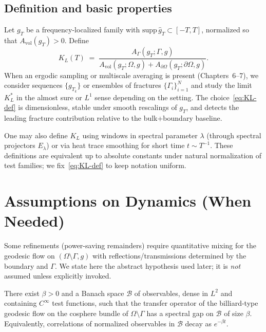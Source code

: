 \subsection{Definition and basic properties}
\label{subsec:intro-KL-def}
Let $g_T$ be a frequency-localized family with
$\mathrm{supp}\,\hat g_T\subset[-T,T]$, normalized so that $A_{\mathrm{vol}}(g_T)>0$.
Define
\begin{equation}
\label{eq:KL-def}
K_L(T)
\;=\;
\frac{A_{\Gamma}(g_T;\Gamma,g)}{A_{\mathrm{vol}}(g_T;\Omega,g)+A_{\partial\Omega}(g_T;\partial\Omega,g)}.
\end{equation}
When an ergodic sampling or multiscale averaging is present (Chapters~6–7), we
consider sequences $\{g_{T_k}\}$ or ensembles of fractures
$\{\Gamma_i\}_{i=1}^N$ and study the limit $K_L^*$ in the almost sure or $L^1$
sense depending on the setting. The choice~\eqref{eq:KL-def} is dimensionless,
stable under smooth rescalings of $g_T$, and detects the leading fracture
contribution relative to the bulk+boundary baseline.

\begin{remark}[Variants]
\label{rem:KL-variants}
One may also define $K_L$ using windows in spectral parameter $\lambda$
(through spectral projectors $E_\lambda$) or via heat trace smoothing for short
time $t\sim T^{-1}$. These definitions are equivalent up to absolute constants
under natural normalization of test families; we fix~\eqref{eq:KL-def} to keep
notation uniform.
\end{remark}

\section{Assumptions on Dynamics (When Needed)}
\label{sec:intro-mixing}

Some refinements (power-saving remainders) require quantitative mixing for the
geodesic flow on $(\Omega\setminus\Gamma,g)$ with reflections/transmissions
determined by the boundary and $\Gamma$. We state here the abstract hypothesis
used later; it is \emph{not} assumed unless explicitly invoked.

\begin{assumption}
\label{ass:mixing}
There exist $\beta>0$ and a Banach space $\mathcal{B}$ of observables, dense
in $L^2$ and containing $C^\infty$ test functions, such that the transfer
operator of the billiard-type geodesic flow on the cosphere bundle of
$\Omega\setminus\Gamma$ has a spectral gap on $\mathcal{B}$ of size $\beta$.
Equivalently, correlations of normalized observables in $\mathcal{B}$ decay as
$e^{-\beta t}$.
\end{assumption}


